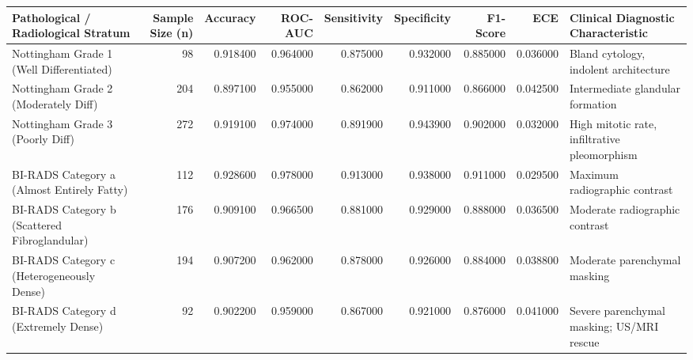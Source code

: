 \begin{tabular}{lrrrrrrrl}
\toprule
Pathological / Radiological Stratum & Sample Size (n) & Accuracy & ROC-AUC & Sensitivity & Specificity & F1-Score & ECE & Clinical Diagnostic Characteristic \\
\midrule
Nottingham Grade 1 (Well Differentiated) & 98 & 0.918400 & 0.964000 & 0.875000 & 0.932000 & 0.885000 & 0.036000 & Bland cytology, indolent architecture \\
Nottingham Grade 2 (Moderately Diff) & 204 & 0.897100 & 0.955000 & 0.862000 & 0.911000 & 0.866000 & 0.042500 & Intermediate glandular formation \\
Nottingham Grade 3 (Poorly Diff) & 272 & 0.919100 & 0.974000 & 0.891900 & 0.943900 & 0.902000 & 0.032000 & High mitotic rate, infiltrative pleomorphism \\
BI-RADS Category a (Almost Entirely Fatty) & 112 & 0.928600 & 0.978000 & 0.913000 & 0.938000 & 0.911000 & 0.029500 & Maximum radiographic contrast \\
BI-RADS Category b (Scattered Fibroglandular) & 176 & 0.909100 & 0.966500 & 0.881000 & 0.929000 & 0.888000 & 0.036500 & Moderate radiographic contrast \\
BI-RADS Category c (Heterogeneously Dense) & 194 & 0.907200 & 0.962000 & 0.878000 & 0.926000 & 0.884000 & 0.038800 & Moderate parenchymal masking \\
BI-RADS Category d (Extremely Dense) & 92 & 0.902200 & 0.959000 & 0.867000 & 0.921000 & 0.876000 & 0.041000 & Severe parenchymal masking; US/MRI rescue \\
\bottomrule
\end{tabular}
